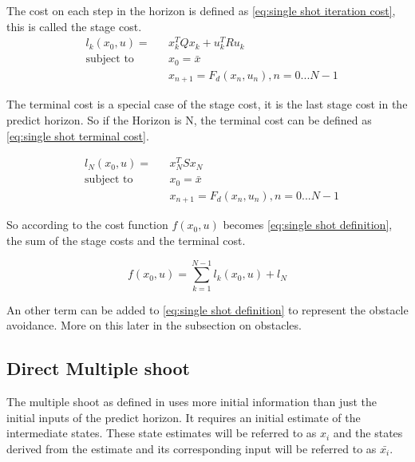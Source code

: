 			The cost on each step in the horizon is defined as \eqref{eq:single shot iteration cost}, this is called the stage cost.
			\begin{equation}
				\begin{aligned}
				& l_k(x_0,u) = &&  x_k^T Q x_k  +  u_k^T R u_k \\
				& \text{subject to}			&& x_0 = \bar{x} \\
				& 							&&  x_{n+1} = F_d(x_n,u_n), n=0...N-1
				\end{aligned}
				\label{eq:single shot iteration cost}
			\end{equation}
			
			The terminal cost is a special case of the stage cost, it is the last stage cost in the predict horizon. So if the Horizon is N, the terminal cost can be defined as \eqref{eq:single shot terminal cost}.
			
			\begin{equation}
				\begin{aligned}
					& l_N(x_0,u) = && x_N^TSx_N \\
					& \text{subject to}			&& x_0 = \bar{x} \\
					& 							&&  x_{n+1} = F_d(x_n,u_n), n=0...N-1
				\end{aligned}
				\label{eq:single shot terminal cost}
			\end{equation}
			
			So according to \cite{Diehl2005} the cost function $f(x_0,u)$ becomes \eqref{eq:single shot definition}, the sum of the stage costs and the terminal cost.
			
			\begin{equation}
				f(x_0,u) = \sum_{k=1}^{N-1} l_k(x_0,u) + l_N
				\label{eq:single shot definition}
			\end{equation}
			
			An other term can be added to \eqref{eq:single shot definition} to represent the obstacle avoidance. More on this later in the subsection on obstacles.
		\subsection{Direct Multiple shoot}
			The multiple shoot as defined in \cite{Diehl2005} uses more initial information than just the initial inputs of the predict horizon. It requires an initial estimate of the intermediate states. These state estimates will be referred to as $x_i$ and the states derived from the estimate and its corresponding input will be referred to as $\bar{x_i}$. 
			
